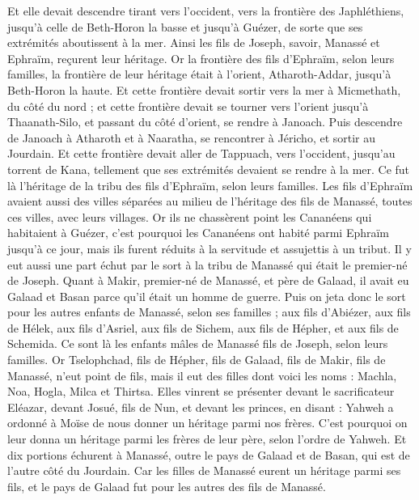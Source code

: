 \begin{multicols}{2}
Et elle devait descendre tirant vers l'occident, vers la frontière des Japhléthiens, jusqu'à celle de Beth-Horon la basse et jusqu'à Guézer, de sorte que ses extrémités aboutissent à la mer.
Ainsi les fils de Joseph, savoir, Manassé et Ephraïm, reçurent leur héritage.
Or la frontière des fils d'Ephraïm, selon leurs familles, la frontière de leur héritage était à l'orient, Atharoth-Addar, jusqu'à Beth-Horon la haute.
Et cette frontière devait sortir vers la mer à Micmethath, du côté du nord ; et cette frontière devait se tourner vers l'orient jusqu'à Thaanath-Silo, et passant du côté d'orient, se rendre à Janoach.
Puis descendre de Janoach à Atharoth et à Naaratha, se rencontrer à Jéricho, et sortir au Jourdain.
Et cette frontière devait aller de Tappuach, vers l'occident, jusqu'au torrent de Kana, tellement que ses extrémités devaient se rendre à la mer. Ce fut là l'héritage de la tribu des fils d'Ephraïm, selon leurs familles.
Les fils d'Ephraïm avaient aussi des villes séparées au milieu de l'héritage des fils de Manassé, toutes ces villes, avec leurs villages.
Or ils ne chassèrent point les Cananéens qui habitaient à Guézer, c'est pourquoi les Cananéens ont habité parmi Ephraïm jusqu'à ce jour, mais ils furent réduits à la servitude et assujettis à un tribut.
\VerseOne{}Il y eut aussi une part échut par le sort à la tribu de Manassé qui était le premier-né de Joseph. Quant à Makir, premier-né de Manassé, et père de Galaad, il avait eu Galaad et Basan parce qu'il était un homme de guerre.
Puis on jeta donc le sort pour les autres enfants de Manassé, selon ses familles ; aux fils d'Abiézer, aux fils de Hélek, aux fils d'Asriel, aux fils de Sichem, aux fils de Hépher, et aux fils de Schemida. Ce sont là les enfants mâles de Manassé fils de Joseph, selon leurs familles.
Or Tselophchad, fils de Hépher, fils de Galaad, fils de Makir, fils de Manassé, n'eut point de fils, mais il eut des filles dont voici les noms : Machla, Noa, Hogla, Milca et Thirtsa.
Elles vinrent se présenter devant le sacrificateur Eléazar, devant Josué, fils de Nun, et devant les princes, en disant : Yahweh a ordonné à Moïse de nous donner un héritage parmi nos frères. C'est pourquoi on leur donna un héritage parmi les frères de leur père, selon l'ordre de Yahweh.
Et dix portions échurent à Manassé, outre le pays de Galaad et de Basan, qui est de l'autre côté du Jourdain.
Car les filles de Manassé eurent un héritage parmi ses fils, et le pays de Galaad fut pour les autres des fils de Manassé.

\end{multicols}
